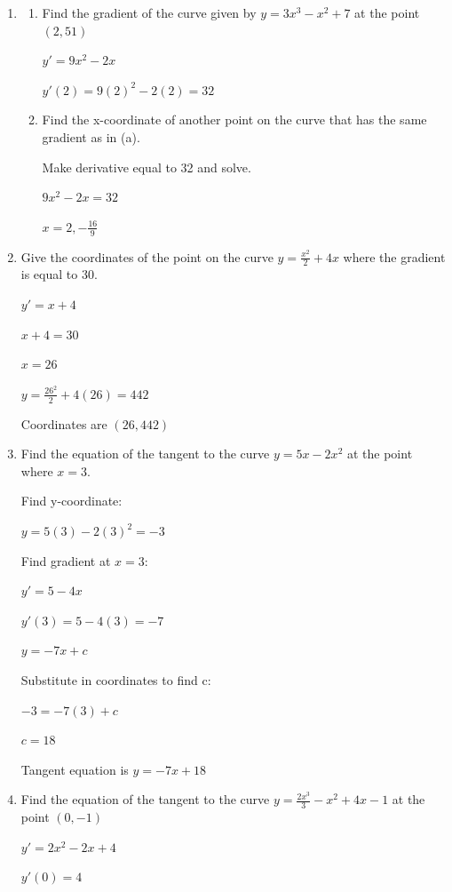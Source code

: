 \documentclass[12pt, letterpaper]{article}
\begin{document}
\begin{enumerate}[itemsep=2cm]
    \item 
    \begin{enumerate}[itemsep=2cm]
        \item Find the gradient of the curve given by $y=3x^3-x^2+7$ at the point $(2, 51)$
        
        $y'=9x^2-2x$

        $y'(2)=9(2)^2-2(2)=32$

        \item Find the x-coordinate of another point on the curve that has the same gradient as in (a).
        
        Make derivative equal to 32 and solve.

        $9x^2-2x=32$

        $x=2, -\frac{16}{9}$
    \end{enumerate}
    

    \item 
    Give the coordinates of the point on the curve $y=\frac{x^2}{2}+4x$ where the gradient is equal to 30.

    $y'=x+4$

    $x+4=30$

    $x=26$

    $y=\frac{26^2}{2}+4(26)=442$

    Coordinates are $(26,442)$


    \item 
    Find the equation of the tangent to the curve $y=5x-2x^2$ at the point where $x=3$.
    
    Find y-coordinate:

    $y=5(3)-2(3)^2=-3$

    Find gradient at $x=3$:

    $y'=5-4x$

    $y'(3)=5-4(3)=-7$

    $y=-7x+c$

    Substitute in coordinates to find c:

    $-3=-7(3)+c$

    $c=18$

    Tangent equation is $y=-7x+18$

    \item 
    Find the equation of the tangent to the curve $y=\frac{2x^3}{3}-x^2+4x-1$ at the point $(0,-1)$

    $y'=2x^2-2x+4$

    $y'(0)=4$


\end{enumerate}
\end{document}
